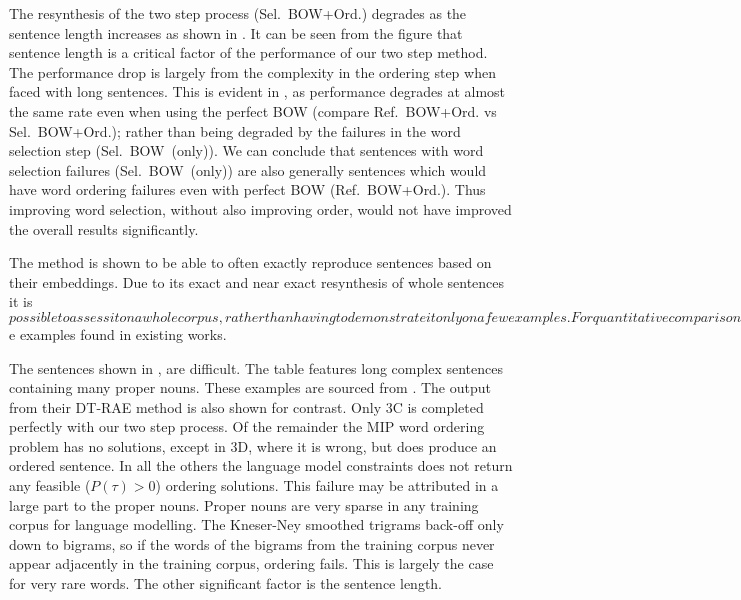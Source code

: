 \documentclass[11pt]{article}
\theoremstyle{plain}
\theoremstyle{definition}
\newcommand{\textcite}{\protect\newcite}
\newcommand{\oracletitle}{Ref.~BOW+Ord.}
\newcommand{\selectiontitle}{Sel.~BOW~(only)}
\newcommand{\twosteptitle}{Sel.~BOW+Ord.}
\begin{document}
\begin{comment}
The resynthesis of the two step process (\twosteptitle{}) degrades as the sentence length increases as shown in \Cref{figure:exactlenscore}. It can be seen from the figure that this is largely caused by errors in the ordering step, rather than in the selection step. Though the selection failures are responsible for the drop in performance of \twosteptitle{} below that of the \oracletitle{}, this decrease is much less than the number of errors  that occur in \selectiontitle{} at that given sentence length. Thus for many sentences even if the word selection was perfect (as in \oracletitle{}), the over all result would still have been imperfect due to failure in finding the order. Thus improving word selection, without also improving order, would not have improved the overall results significantly.
\end{comment}

The resynthesis of the two step process (\twosteptitle{}) degrades as the sentence length increases as shown in . It can be seen from the figure that sentence length is a critical factor of the performance of our two step method. The performance drop is largely from the complexity in the ordering step when faced with long sentences. This is evident in , as performance degrades at almost the same rate even when using the perfect BOW (compare \oracletitle{} vs \twosteptitle{}); rather than being degraded by the failures in the word selection step (\selectiontitle{}). We can conclude that sentences with word selection failures (\selectiontitle{}) are also generally sentences which would have word ordering failures even with perfect BOW (\oracletitle{}). Thus improving word selection, without also improving order, would not have improved the overall results significantly.


The method is shown to be able to often exactly reproduce sentences based on their embeddings.  Due to its exact and near exact resynthesis of whole sentences it is $ possible to assess it on a whole corpus, rather than having to demonstrate it only on a few examples. For quantitative comparison, the algorithm was also executed on th $e examples found in existing works.

The sentences shown in , are difficult. The table features long complex sentences containing many proper nouns. These examples are sourced from \textcite{iyyer2014generating}. The output from their DT-RAE method is also shown for contrast. Only 3C is completed perfectly with our two step process. Of the remainder the MIP word ordering problem has no solutions, except in 3D, where it is wrong, but does produce an ordered sentence. In all the others the language model constraints does not return any feasible ($P(\tau)>0$) ordering solutions. This failure may be attributed in a large part to the proper nouns.  Proper nouns are very sparse in any training corpus for language modelling. The Kneser-Ney smoothed trigrams back-off only down to bigrams, so if the words of the bigrams from the training corpus never appear adjacently in the training corpus, ordering fails. This is largely the case for very rare words. The other significant factor is the sentence length.
\end{document}
